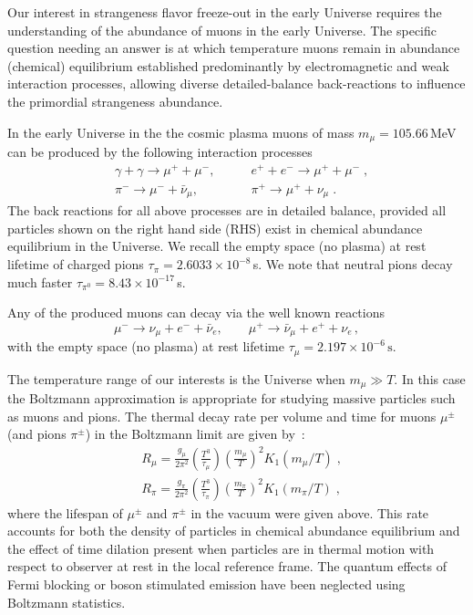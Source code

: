 \label{section_muon}
%
Our interest in strangeness flavor freeze-out in the early Universe requires the understanding of the abundance of muons in the early Universe. The specific question needing an answer is at which temperature muons remain in abundance (chemical) equilibrium established predominantly by electromagnetic and weak interaction processes, allowing diverse detailed-balance back-reactions to influence the primordial strangeness abundance.

In the early Universe in the the cosmic plasma muons of mass $m_\mu=105.66$\,MeV can be produced by the following interaction processes~\cite{Yang:2024ret,Rafelski:2021aey}
\begin{align} 
&\gamma+\gamma\longrightarrow\mu^++\mu^-,\qquad & e^++e^-\longrightarrow \mu^++\mu^-\;,\\
&\pi^-\longrightarrow\mu^-+\bar{\nu}_\mu,\qquad & \pi^+\longrightarrow\mu^++\nu_\mu\;.
\end{align}
The back reactions for all above processes are in detailed balance, provided all particles shown on the right hand side (RHS) exist in chemical abundance equilibrium in the Universe. We recall the empty space (no plasma) at rest lifetime of charged pions $\tau_\pi=2.6033\times 10^{-8}$\,s. We note that neutral pions decay much faster $\tau_{\pi^0}=8.43\times 10^{-17}$\,s.

Any of the produced muons can decay via the well known reactions
\begin{equation}
\mu^-\rightarrow\nu_\mu+e^-+\bar{\nu}_e,\qquad \mu^+\rightarrow\bar{\nu}_\mu+e^++\nu_e\,,
\end{equation} 
with the empty space (no plasma) at rest lifetime $\tau_{\mu}=2.197 \times 10^{-6}\,\mathrm{s}$.  
 
The temperature range of our interests is the Universe when $m_\mu\gg T$. In this case  the Boltzmann approximation is appropriate for studying massive particles such as muons and pions. The thermal decay rate per volume and time  for muons $\mu^\pm$ (and pions $\pi^\pm$) in the Boltzmann limit  are given by~\cite{Kuznetsova:2010pi}:
\begin{align}
&R_\mu=\frac{g_\mu}{2\pi^2}\left(\frac{T^3}{\tau_\mu}\right)\left(\frac{m_\mu}{T}\right)^2K_1(m_\mu/T)\;,\\
&R_\pi=\frac{g_\pi}{2\pi^2}\left(\frac{T^3}{\tau_\pi}\right)\left(\frac{m_\pi}{T}\right)^2K_1(m_\pi/T)\;, 
\end{align}
where the lifespan of $\mu^\pm$ and $\pi^\pm$ in the vacuum were given above. This rate accounts for both the density of particles in chemical abundance equilibrium and the effect of time dilation present when particles are in thermal motion with respect to observer at rest in the local reference frame. The quantum effects of Fermi blocking or boson stimulated emission have been neglected using Boltzmann statistics.

